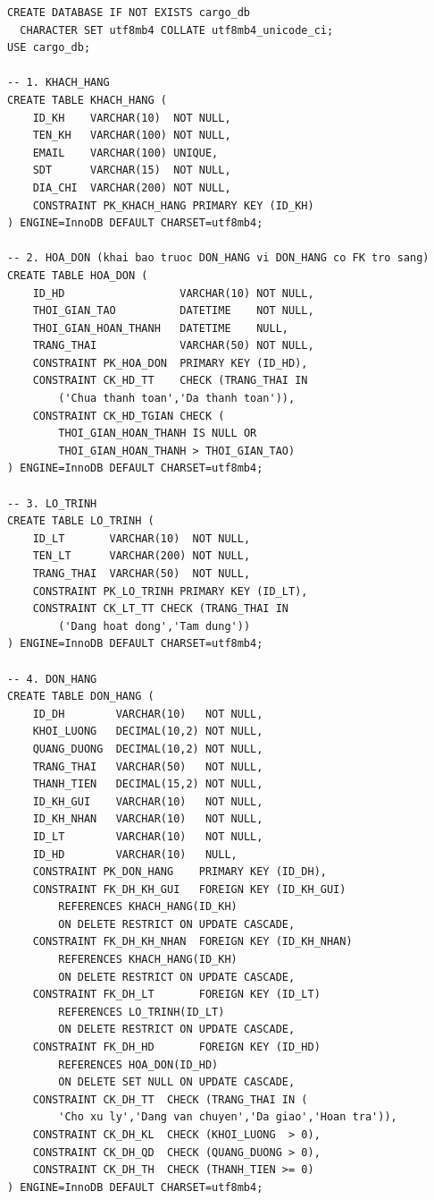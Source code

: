 \documentclass[11pt]{report}
\begin{document}
\begin{verbatim}
CREATE DATABASE IF NOT EXISTS cargo_db
  CHARACTER SET utf8mb4 COLLATE utf8mb4_unicode_ci;
USE cargo_db;

-- 1. KHACH_HANG
CREATE TABLE KHACH_HANG (
    ID_KH    VARCHAR(10)  NOT NULL,
    TEN_KH   VARCHAR(100) NOT NULL,
    EMAIL    VARCHAR(100) UNIQUE,
    SDT      VARCHAR(15)  NOT NULL,
    DIA_CHI  VARCHAR(200) NOT NULL,
    CONSTRAINT PK_KHACH_HANG PRIMARY KEY (ID_KH)
) ENGINE=InnoDB DEFAULT CHARSET=utf8mb4;

-- 2. HOA_DON (khai bao truoc DON_HANG vi DON_HANG co FK tro sang)
CREATE TABLE HOA_DON (
    ID_HD                  VARCHAR(10) NOT NULL,
    THOI_GIAN_TAO          DATETIME    NOT NULL,
    THOI_GIAN_HOAN_THANH   DATETIME    NULL,
    TRANG_THAI             VARCHAR(50) NOT NULL,
    CONSTRAINT PK_HOA_DON  PRIMARY KEY (ID_HD),
    CONSTRAINT CK_HD_TT    CHECK (TRANG_THAI IN
        ('Chua thanh toan','Da thanh toan')),
    CONSTRAINT CK_HD_TGIAN CHECK (
        THOI_GIAN_HOAN_THANH IS NULL OR
        THOI_GIAN_HOAN_THANH > THOI_GIAN_TAO)
) ENGINE=InnoDB DEFAULT CHARSET=utf8mb4;

-- 3. LO_TRINH
CREATE TABLE LO_TRINH (
    ID_LT       VARCHAR(10)  NOT NULL,
    TEN_LT      VARCHAR(200) NOT NULL,
    TRANG_THAI  VARCHAR(50)  NOT NULL,
    CONSTRAINT PK_LO_TRINH PRIMARY KEY (ID_LT),
    CONSTRAINT CK_LT_TT CHECK (TRANG_THAI IN
        ('Dang hoat dong','Tam dung'))
) ENGINE=InnoDB DEFAULT CHARSET=utf8mb4;

-- 4. DON_HANG
CREATE TABLE DON_HANG (
    ID_DH        VARCHAR(10)   NOT NULL,
    KHOI_LUONG   DECIMAL(10,2) NOT NULL,
    QUANG_DUONG  DECIMAL(10,2) NOT NULL,
    TRANG_THAI   VARCHAR(50)   NOT NULL,
    THANH_TIEN   DECIMAL(15,2) NOT NULL,
    ID_KH_GUI    VARCHAR(10)   NOT NULL,
    ID_KH_NHAN   VARCHAR(10)   NOT NULL,
    ID_LT        VARCHAR(10)   NOT NULL,
    ID_HD        VARCHAR(10)   NULL,
    CONSTRAINT PK_DON_HANG    PRIMARY KEY (ID_DH),
    CONSTRAINT FK_DH_KH_GUI   FOREIGN KEY (ID_KH_GUI)
        REFERENCES KHACH_HANG(ID_KH)
        ON DELETE RESTRICT ON UPDATE CASCADE,
    CONSTRAINT FK_DH_KH_NHAN  FOREIGN KEY (ID_KH_NHAN)
        REFERENCES KHACH_HANG(ID_KH)
        ON DELETE RESTRICT ON UPDATE CASCADE,
    CONSTRAINT FK_DH_LT       FOREIGN KEY (ID_LT)
        REFERENCES LO_TRINH(ID_LT)
        ON DELETE RESTRICT ON UPDATE CASCADE,
    CONSTRAINT FK_DH_HD       FOREIGN KEY (ID_HD)
        REFERENCES HOA_DON(ID_HD)
        ON DELETE SET NULL ON UPDATE CASCADE,
    CONSTRAINT CK_DH_TT  CHECK (TRANG_THAI IN (
        'Cho xu ly','Dang van chuyen','Da giao','Hoan tra')),
    CONSTRAINT CK_DH_KL  CHECK (KHOI_LUONG  > 0),
    CONSTRAINT CK_DH_QD  CHECK (QUANG_DUONG > 0),
    CONSTRAINT CK_DH_TH  CHECK (THANH_TIEN >= 0)
) ENGINE=InnoDB DEFAULT CHARSET=utf8mb4;


\end{verbatim}
\end{document}
